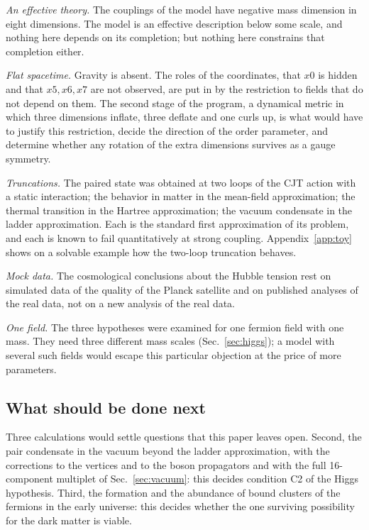 \emph{An effective theory.} The couplings of the model have negative mass dimension in eight
dimensions. The model is an effective description below some scale, and nothing here depends on its
completion; but nothing here constrains that completion either.

\emph{Flat spacetime.} Gravity is absent. The roles of the coordinates, that $x0$ is hidden and that
$x5,x6,x7$ are not observed, are put in by the restriction to fields that do not depend on them. The
second stage of the program, a dynamical metric in which three dimensions inflate, three deflate and
one curls up, is what would have to justify this restriction, decide the direction of the order
parameter, and determine whether any rotation of the extra dimensions survives as a gauge symmetry.

\emph{Truncations.} The paired state was obtained at two loops of the CJT action with a static
interaction; the behavior in matter in the mean-field approximation; the thermal transition in the
Hartree approximation; the vacuum condensate in the ladder approximation. Each is the standard first
approximation of its problem, and each is known to fail quantitatively at strong coupling.
Appendix~\ref{app:toy} shows on a solvable example how the two-loop truncation behaves.

\emph{Mock data.} The cosmological conclusions about the Hubble tension rest on simulated data of the
quality of the Planck satellite and on published analyses of the real data, not on a new analysis of
the real data.

\emph{One field.} The three hypotheses were examined for one fermion field with one mass. They need
three different mass scales (Sec.~\ref{sec:higgs}); a model with several such fields would escape
this particular objection at the price of more parameters.

\subsection{What should be done next}

Three calculations would settle questions that this paper leaves open.  Second, the pair condensate in the vacuum beyond the
ladder approximation, with the corrections to the vertices and to the boson propagators and with the
full 16-component multiplet of Sec.~\ref{sec:vacuum}: this decides condition C2 of the Higgs
hypothesis. Third, the formation and the abundance of bound clusters of the fermions in the early
universe: this decides whether the one surviving possibility for the dark matter is viable.

